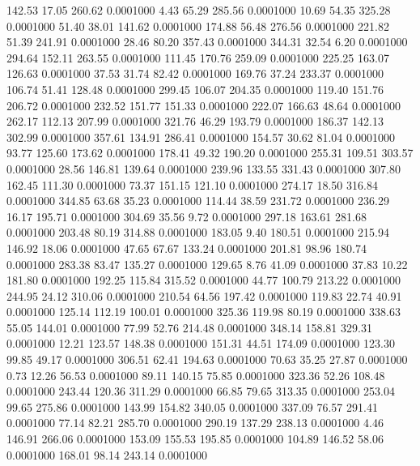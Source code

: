  142.53   17.05  260.62   0.0001000
   4.43   65.29  285.56   0.0001000
  10.69   54.35  325.28   0.0001000
  51.40   38.01  141.62   0.0001000
 174.88   56.48  276.56   0.0001000
 221.82   51.39  241.91   0.0001000
  28.46   80.20  357.43   0.0001000
 344.31   32.54    6.20   0.0001000
 294.64  152.11  263.55   0.0001000
 111.45  170.76  259.09   0.0001000
 225.25  163.07  126.63   0.0001000
  37.53   31.74   82.42   0.0001000
 169.76   37.24  233.37   0.0001000
 106.74   51.41  128.48   0.0001000
 299.45  106.07  204.35   0.0001000
 119.40  151.76  206.72   0.0001000
 232.52  151.77  151.33   0.0001000
 222.07  166.63   48.64   0.0001000
 262.17  112.13  207.99   0.0001000
 321.76   46.29  193.79   0.0001000
 186.37  142.13  302.99   0.0001000
 357.61  134.91  286.41   0.0001000
 154.57   30.62   81.04   0.0001000
  93.77  125.60  173.62   0.0001000
 178.41   49.32  190.20   0.0001000
 255.31  109.51  303.57   0.0001000
  28.56  146.81  139.64   0.0001000
 239.96  133.55  331.43   0.0001000
 307.80  162.45  111.30   0.0001000
  73.37  151.15  121.10   0.0001000
 274.17   18.50  316.84   0.0001000
 344.85   63.68   35.23   0.0001000
 114.44   38.59  231.72   0.0001000
 236.29   16.17  195.71   0.0001000
 304.69   35.56    9.72   0.0001000
 297.18  163.61  281.68   0.0001000
 203.48   80.19  314.88   0.0001000
 183.05    9.40  180.51   0.0001000
 215.94  146.92   18.06   0.0001000
  47.65   67.67  133.24   0.0001000
 201.81   98.96  180.74   0.0001000
 283.38   83.47  135.27   0.0001000
 129.65    8.76   41.09   0.0001000
  37.83   10.22  181.80   0.0001000
 192.25  115.84  315.52   0.0001000
  44.77  100.79  213.22   0.0001000
 244.95   24.12  310.06   0.0001000
 210.54   64.56  197.42   0.0001000
 119.83   22.74   40.91   0.0001000
 125.14  112.19  100.01   0.0001000
 325.36  119.98   80.19   0.0001000
 338.63   55.05  144.01   0.0001000
  77.99   52.76  214.48   0.0001000
 348.14  158.81  329.31   0.0001000
  12.21  123.57  148.38   0.0001000
 151.31   44.51  174.09   0.0001000
 123.30   99.85   49.17   0.0001000
 306.51   62.41  194.63   0.0001000
  70.63   35.25   27.87   0.0001000
   0.73   12.26   56.53   0.0001000
  89.11  140.15   75.85   0.0001000
 323.36   52.26  108.48   0.0001000
 243.44  120.36  311.29   0.0001000
  66.85   79.65  313.35   0.0001000
 253.04   99.65  275.86   0.0001000
 143.99  154.82  340.05   0.0001000
 337.09   76.57  291.41   0.0001000
  77.14   82.21  285.70   0.0001000
 290.19  137.29  238.13   0.0001000
   4.46  146.91  266.06   0.0001000
 153.09  155.53  195.85   0.0001000
 104.89  146.52   58.06   0.0001000
 168.01   98.14  243.14   0.0001000
